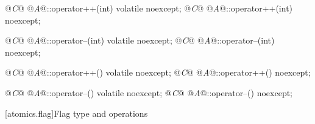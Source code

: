 %
%
\begin{itemdecl}
@\textit{C}@ @\textit{A}@::operator++(int) volatile noexcept;
@\textit{C}@ @\textit{A}@::operator++(int) noexcept;
\end{itemdecl}

\begin{itemdescr}
\pnum
\returns {}
\end{itemdescr}

%
%
\begin{itemdecl}
@\textit{C}@ @\textit{A}@::operator--(int) volatile noexcept;
@\textit{C}@ @\textit{A}@::operator--(int) noexcept;
\end{itemdecl}

\begin{itemdescr}
\pnum
\returns {}
\end{itemdescr}

%
%
\begin{itemdecl}
@\textit{C}@ @\textit{A}@::operator++() volatile noexcept;
@\textit{C}@ @\textit{A}@::operator++() noexcept;
\end{itemdecl}

\begin{itemdescr}
\pnum
\effects {}

\pnum
\returns {}
\end{itemdescr}

%
%
\begin{itemdecl}
@\textit{C}@ @\textit{A}@::operator--() volatile noexcept;
@\textit{C}@ @\textit{A}@::operator--() noexcept;
\end{itemdecl}

\begin{itemdescr}
\pnum
\effects {}

\pnum
\returns {}
\end{itemdescr}

[atomics.flag]{Flag type and operations}

